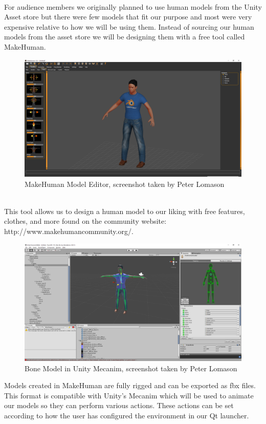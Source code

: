 \documentclass[a4paper,10pt]{article}
\begin{document}
\par~\\
For audience members we originally planned to use human models from the Unity Asset store but there were few models that fit our purpose and most were very expensive relative to how we will be using them. Instead of sourcing our human models from the asset store we will be designing them with a free tool called MakeHuman. 
\begin{figure}[H] %
	\centerline {\includegraphics[scale = 0.28]{makeHuman.png}}
	\caption{MakeHuman Model Editor, screenshot taken by Peter Lomason}
	\label{fig:makeHuman}
\end{figure}
\par~\\
This tool allows us to design a human model to our liking with free features, clothes, and more found on the community website: http://www.makehumancommunity.org/.
\par
\begin{figure}[H] %
	\centerline {\includegraphics[scale = 0.28]{unityMecanim.png}}
	\caption{Bone Model in Unity Mecanim, screenshot taken by Peter Lomason}
	\label{fig:unityMecanim}
\end{figure}
Models created in MakeHuman are fully rigged and can be exported as fbx files. This format is compatible with Unity's Mecanim which will be used to animate our models so they can perform various actions. These actions can be set according to how the user has configured the environment in our Qt launcher.
\end{document}
